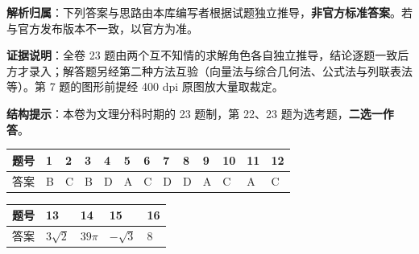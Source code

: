 
\begin{gknotice}
\textbf{解析归属}：下列答案与思路由本库编写者根据试题独立推导，\textbf{非官方标准答案}。若与官方发布版本不一致，以官方为准。

\textbf{证据说明}：全卷 23 题由两个互不知情的求解角色各自独立推导，结论逐题一致后方才录入；解答题另经第二种方法互验（向量法与综合几何法、公式法与列联表法等）。第 7 题的图形前提经 400 dpi 原图放大量取裁定。

\textbf{结构提示}：本卷为文理分科时期的 23 题制，第 22、23 题为选考题，\textbf{二选一作答}。
\end{gknotice}


\begin{center}
\begingroup\setlength{\tabcolsep}{4pt}
\begin{tabular}{lllllllllllll}
\toprule
题号 & 1 & 2 & 3 & 4 & 5 & 6 & 7 & 8 & 9 & 10 & 11 & 12 \\
\midrule
答案 & B & C & B & D & A & C & D & D & A & C & A & C \\
\bottomrule
\end{tabular}
\endgroup
\end{center}

\begin{center}
\begin{tabular}{lllll}
\toprule
题号 & 13 & 14 & 15 & 16 \\
\midrule
答案 & $3\sqrt2$ & $39\pi$ & $-\sqrt3$ & $8$ \\
\bottomrule
\end{tabular}
\end{center}

\par\medskip


